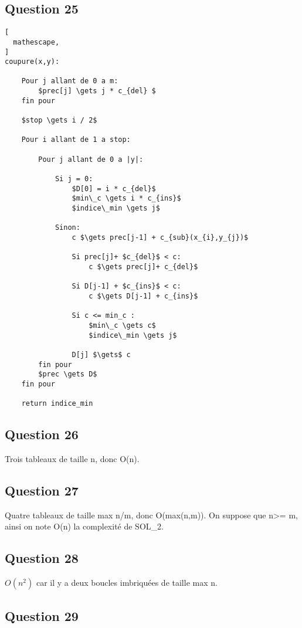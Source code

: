 \documentclass{report}
\begin{document}
\clearpage
\subsection*{Question 25}

\begin{lstlisting}[
  mathescape,
]
coupure(x,y):

    Pour j allant de 0 a m:
        $prec[j] \gets j * c_{del} $
    fin pour
    
    $stop \gets i / 2$
    
    Pour i allant de 1 a stop:
    
        Pour j allant de 0 a |y|:
        
            Si j = 0:
                $D[0] = i * c_{del}$
                $min\_c \gets i * c_{ins}$
                $indice\_min \gets j$
                
            Sinon:
                c $\gets prec[j-1] + c_{sub}(x_{i},y_{j})$
                    
                Si prec[j]+ $c_{del}$ < c:
                    c $\gets prec[j]+ c_{del}$

                Si D[j-1] + $c_{ins}$ < c:
                    c $\gets D[j-1] + c_{ins}$
                    
                Si c <= min_c :
                    $min\_c \gets c$
                    $indice\_min \gets j$
                        
                D[j] $\gets$ c
        fin pour
        $prec \gets D$
    fin pour
    
    return indice_min

\end{lstlisting}


\subsection*{Question 26}
Trois tableaux de taille n, donc O(n).

\subsection*{Question 27}
Quatre tableaux de taille max n/m, donc O(max(n,m)). On suppose que n>= m, ainsi on note O(n) la complexité de SOL\_2.

\subsection*{Question 28}
$O(n^{2})$ car il y a deux boucles imbriquées de taille max n.

\subsection*{Question 29}
\end{document}
